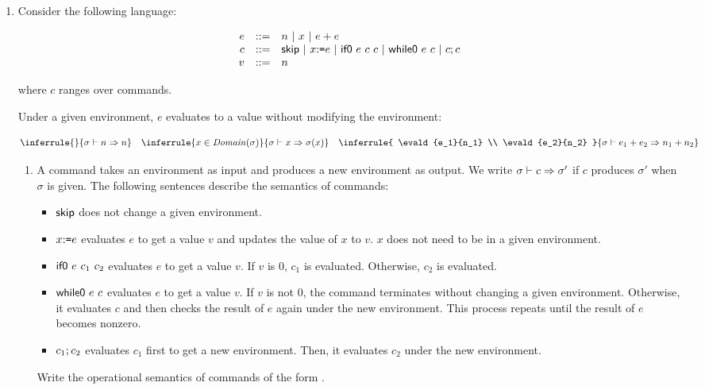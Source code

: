 \begin{enumerate}
\item Consider the following language:

\vspace{-1em}

\[
\begin{array}{rcl}
  e & ::= & n\ |\ x\ |\ e+e \\
  c & ::= & \textsf{skip}\ |\ x{:}\texttt{=} e\ |\ \textsf{if0}\ e\ c\ c
  \ |\ \textsf{while0}\ e\ c\ |\ c;c \\
  v & ::= & n \\
\end{array}
\]

where $c$ ranges over commands.

Under a given environment, $e$ evaluates to a value without modifying the
environment:

\[
  \inferrule
  {}
  { \evald{n}{n} }
  \quad
  \inferrule
  { x\in\dom{\sigma} }
  { \evald{x}{\sigma(x)} }
  \quad
  \inferrule
  { \evald{e_1}{n_1} \\ \evald{e_2}{n_2} }
  { \evald{\eadd{e_1}{e_2}}{n_1+n_2} }
\]

\begin{enumerate}
  \item
    A command takes an environment as input and produces a new environment as
    output. We write $\sigma\vdash c\Rightarrow\sigma'$ if $c$ produces $\sigma'$ when
    $\sigma$ is given.
    The following sentences describe the semantics of commands:
    \begin{itemize}
      \item $\textsf{skip}$ does not change a given environment.
      \item $x{:}\texttt{=} e$ evaluates $e$ to get a value $v$ and
        updates the value of $x$ to $v$. $x$ does not need to be in a given
        environment.
      \item $\textsf{if0}\ e\ c_1\ c_2$ evaluates $e$ to get a value $v$.
        If $v$ is $0$, $c_1$ is evaluated. Otherwise, $c_2$ is evaluated.
      \item $\textsf{while0}\ e\ c$ evaluates $e$ to get a value $v$.
        If $v$ is not $0$, the command terminates without changing a given
        environment. Otherwise, it evaluates $c$ and then checks the result of $e$ again
        under the new environment.
        This process repeats until the result of $e$ becomes nonzero.
      \item $c_1;c_2$ evaluates $c_1$ first to get a new environment.
        Then, it evaluates $c_2$ under the new environment.
    \end{itemize}
    Write the operational semantics of commands of the form
    .


\end{enumerate}
\end{enumerate}
